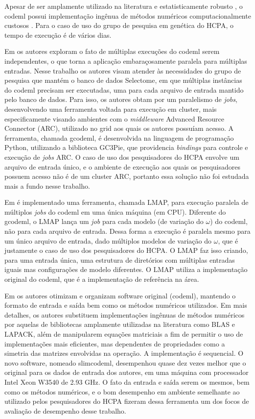 \documentclass[cic,tc]{iiufrgs}
\begin{document}
Apesar de ser amplamente utilizado na literatura e estatisticamente
robusto \cite{maldonado2016lmap}, o codeml possui implementação ingênua de
métodos numéricos computacionalmente custosos \cite{yang2020paml}. Para o caso
de uso do grupo de pesquisa em genética do HCPA, o tempo de execução é de
vários dias.

Em \cite{moretti2012gcodeml} os autores exploram o fato de múltiplas execuções
do codeml serem independentes, o que torna a aplicação embaraçosamente
paralela para múltiplas entradas. Nesse trabalho os autores visam atender às
necessidades do grupo de pesquisa que mantém o banco de dados Selectome, em
que múltiplas instâncias do codeml precisam ser executadas, uma para cada
arquivo de entrada mantido pelo banco de dados. Para isso, os autores obtam
por um paralelismo de \textit{jobs}, desenvolvendo uma ferramenta voltada
para execução em cluster, mais especificamente visando ambientes com o
\textit{middleware} Advanced Resource Connector (ARC), utilizado no grid aos
quais os autores possuíam acesso. A ferramenta, chamada gcodeml, é desenvolvida
na linguagem de programação Python, utilizando a biblioteca GC3Pie, que
providencia \textit{bindings} para controle e execução de \textit{jobs} ARC. O
caso de uso dos pesquisadores do HCPA envolve um arquivo de entrada único, e
o ambiente de execução aos quais os pesquisadores possuem acesso não é de um
cluster ARC, portanto essa solução não foi estudada mais a fundo nesse trabalho.

Em \cite{maldonado2016lmap} é implementado uma
ferramenta, chamada LMAP, para execução paralela de múltiplos \textit{jobs} do
codeml em uma única máquina (em CPU). Diferente do gcodeml, o LMAP lança um
\textit{job} para cada modelo (de variação do $\omega$) do codeml, não para
cada arquivo de entrada. Dessa forma a execução é paralela mesmo para um único
arquivo de entrada, dado múltiplos modelos de variação do $\omega$, que é
justamente o caso de uso dos pesquisadores do HCPA. O LMAP faz isso criando,
para uma entrada única, uma estrutura de diretórios com múltiplas entradas
iguais mas configurações de modelo diferentes. O LMAP utiliza a implementação
original do codeml, que é a implementação de referência na área.

Em \cite{schabauer2012slimcodeml} os autores otimizam e organizam software
original (codeml), mantendo o formato de entrada e saída bem como os métodos
numéricos utilizados. Em mais detalhes, os autores substituem implementações
ingênuas de métodos numéricos por aquelas de bibliotecas amplamente utilizadas
na literatura como BLAS e LAPACK, além de manipularem equações matriciais a fim
de permitir o uso de implementações mais eficientes, mas dependentes de
propriedades como a simetria das matrizes envolvidas na operação. A
implementação é sequencial. O novo software, nomeado slimcodeml, desempenhou
quase dez vezes melhor que o original para os dados de entrada dos autores, em
uma máquina com processador Intel Xeon W3540 de 2.93 GHz. O fato da entrada e
saída serem os mesmos, bem como os métodos numéricos, e o bom desempenho em
ambiente semelhante ao utilizado pelos pesquisadores do HCPA fizeram dessa
ferramenta um dos focos de avaliação de desempenho desse trabalho.
\end{document}
